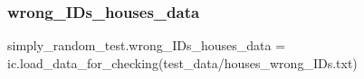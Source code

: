 \subsubsection{\texorpdfstring{wrong\+\_\+\+I\+Ds\+\_\+houses\+\_\+data}{wrong\_IDs\_houses\_data}}
{\footnotesize\ttfamily simply\+\_\+random\+\_\+test.\+wrong\+\_\+\+I\+Ds\+\_\+houses\+\_\+data = ic.\+load\+\_\+data\+\_\+for\+\_\+checking(\textquotesingle{}test\+\_\+data/houses\+\_\+wrong\+\_\+\+I\+Ds.\+txt\textquotesingle{})}

